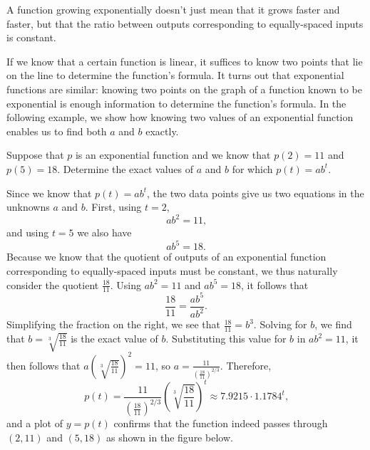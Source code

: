 \documentclass[nooutcomes]{ximera}
\begin{document}
\begin{remark}
A function growing exponentially doesn't just mean that it grows faster and faster, but that the ratio between outputs corresponding to equally-spaced inputs is constant.
\end{remark}

If we know that a certain function is linear, it suffices to know two points that lie on the line to determine the function's formula.  It turns out that exponential functions are similar:  knowing two points on the graph of a function known to be exponential is enough information to determine the function's formula.  In the following example, we show how knowing two values of an exponential function enables us to find both $a$ and $b$ exactly.

\begin{example}\label{example:exp1}
Suppose that $p$ is an exponential function and we know that $p(2) = 11$ and $p(5) = 18$.  Determine the exact values of $a$ and $b$ for which $p(t) = ab^t$.

\begin{explanation}
Since we know that $p(t) = ab^t$, the two data points give us two equations in the unknowns $a$ and $b$.  First, using $t = 2$,%
\begin{equation*}
ab^2 = 11\text{,}
\end{equation*}
and using $t = 5$ we also have%
\begin{equation*}
ab^5 = 18\text{.}
\end{equation*}
Because we know that the quotient of outputs of an exponential function corresponding to equally-spaced inputs must be constant, we thus naturally consider the quotient $\frac{18}{11}$.  Using $ab^2 = 11$ and $ab^5 = 18$, it follows that%
\begin{equation*}
\frac{18}{11} = \frac{ab^5}{ab^2}\text{.}
\end{equation*}
Simplifying the fraction on the right, we see that $\frac{18}{11} = b^3$. Solving for $b$, we find that $b = \sqrt[3]{\frac{18}{11}}$ is the exact value of $b$.  Substituting this value for $b$ in $ab^2 = 11$, it then follows that $a \left( \sqrt[3]{\frac{18}{11}} \right)^2 = 11$, so $a = \frac{11}{\left( \frac{18}{11} \right)^{2/3}}$.  Therefore,%
\begin{equation*}
p(t) = \frac{11}{\left( \frac{18}{11} \right)^{2/3}} \left( \sqrt[3]{\frac{18}{11}} \right)^t \approx 7.9215 \cdot 1.1784^t\text{,}
\end{equation*}
and a plot of $y = p(t)$ confirms that the function indeed passes through $(2,11)$ and $(5,18)$ as shown in the figure below.


\end{explanation}
\end{example}
\end{document}
